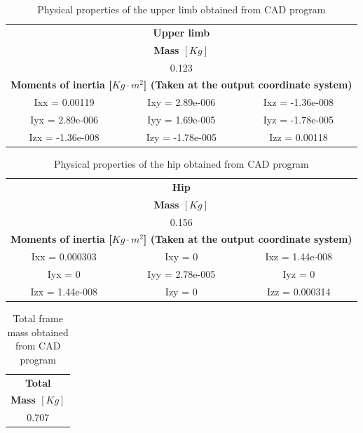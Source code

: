 \begin{table}[htbp]
\caption{Physical properties of the upper limb obtained from CAD program}
\begin{center}
\begin{tabular}{c|l|l}
\multicolumn{ 3}{c}{\Large \textbf{Upper limb}} \\
\multicolumn{ 3}{c}{\textbf{Mass $[Kg]$}} \\ \hline
\multicolumn{ 3}{c}{0.123} \\ \hline
\multicolumn{ 3}{c}{\textbf{Moments of inertia [$Kg \cdot m^2$] (Taken at the output coordinate system)}} \\ \hline
Ixx = 0.00119 & \multicolumn{1}{c|}{Ixy = 2.89e-006} & \multicolumn{1}{c}{Ixz = -1.36e-008} \\ \hline
Iyx = 2.89e-006 & \multicolumn{1}{c|}{Iyy = 1.69e-005} & \multicolumn{1}{c}{Iyz = -1.78e-005} \\ \hline
Izx = -1.36e-008 & \multicolumn{1}{c|}{Izy = -1.78e-005} & \multicolumn{1}{c}{Izz = 0.00118} \\ 
\end{tabular}
\end{center}
\label{tab:upper_limb_physical_properties}
\end{table}


\begin{table}[htbp]
\caption{Physical properties of the hip obtained from CAD program}
\begin{center}
\begin{tabular}{c|l|l}
\multicolumn{ 3}{c}{\Large \textbf{Hip}} \\ 
\multicolumn{ 3}{c}{\textbf{Mass $[Kg]$}} \\ \hline
\multicolumn{ 3}{c}{0.156} \\ \hline
\multicolumn{ 3}{c}{\textbf{Moments of inertia [$Kg \cdot m^2$] (Taken at the output coordinate system)}} \\ \hline
Ixx = 0.000303 & \multicolumn{1}{c|}{Ixy = 0} & \multicolumn{1}{c}{Ixz = 1.44e-008} \\ \hline
Iyx = 0 & \multicolumn{1}{c|}{Iyy = 2.78e-005} & \multicolumn{1}{c}{Iyz = 0} \\ \hline
Izx = 1.44e-008 & \multicolumn{1}{c|}{Izy = 0} & \multicolumn{1}{c}{Izz = 0.000314} \\ 
\end{tabular}
\end{center}
\label{tab:hip_physical_properties}
\end{table}


\begin{table}[htbp]
\caption{Total frame mass obtained from CAD program}
\begin{center}
\begin{tabular}{c|l|l}
\multicolumn{ 3}{c}{\Large \textbf{Total}} \\ 
\multicolumn{ 3}{c}{\textbf{Mass $[Kg]$}} \\ \hline
\multicolumn{ 3}{c}{0.707} \\ \hline
\end{tabular}
\end{center}
\label{tab:total_mass}
\end{table}


